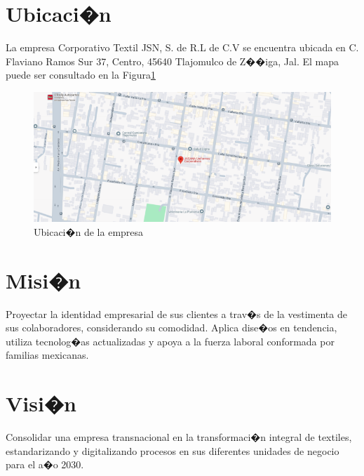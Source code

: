 \documentclass[12pt,letterpaper,spanish, xcolor=table]{report}
\begin{document}

\section{Ubicaci�n}
La empresa Corporativo Textil JSN, S. de R.L de C.V se encuentra ubicada en C. Flaviano Ramos Sur 37, Centro, 45640 Tlajomulco de Z��iga, Jal. El mapa puede ser consultado en la Figura\ref{a1}

\begin{figure}[htp]
  \centering
  \includegraphics*{mapajasana1.png}
  \caption{Ubicaci�n de la empresa}\label{a1}
\end{figure}




\section{Misi�n}
Proyectar la identidad empresarial de sus clientes a trav�s de la vestimenta de sus colaboradores, considerando su comodidad. Aplica dise�os en tendencia, utiliza tecnolog�as actualizadas y apoya a la fuerza laboral conformada por familias mexicanas.

\section{Visi�n}
Consolidar una empresa transnacional en la transformaci�n integral de textiles, estandarizando y digitalizando procesos en sus diferentes unidades de negocio para el a�o 2030.
\end{document}
